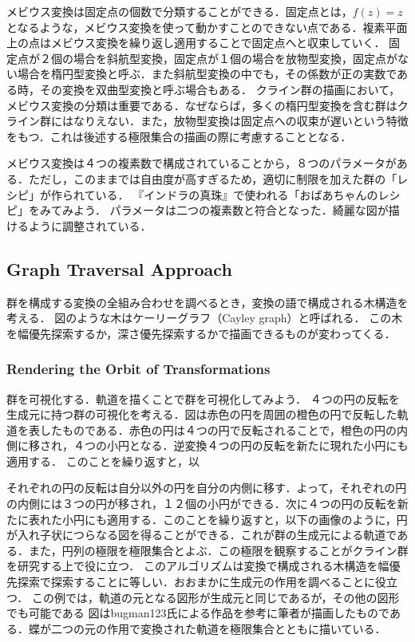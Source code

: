 メビウス変換は固定点の個数で分類することができる．固定点とは，$f(z) = z$となるような，メビウス変換を使って動かすことのできない点である．複素平面上の点はメビウス変換を繰り返し適用することで固定点へと収束していく．
固定点が２個の場合を斜航型変換，固定点が１個の場合を放物型変換，固定点がない場合を楕円型変換と呼ぶ．また斜航型変換の中でも，その係数が正の実数である時，その変換を双曲型変換と呼ぶ場合もある．
クライン群の描画において，メビウス変換の分類は重要である．なぜならば，多くの楕円型変換を含む群はクライン群にはなりえない．また，放物型変換は固定点への収束が遅いという特徴をもつ．これは後述する極限集合の描画の際に考慮することとなる．

メビウス変換は４つの複素数で構成されていることから，８つのパラメータがある．ただし，このままでは自由度が高すぎるため，適切に制限を加えた群の「レシピ」が作られている．
『インドラの真珠』で使われる「おばあちゃんのレシピ」をみてみよう．
パラメータは二つの複素数と符合となった．綺麗な図が描けるように調整されている．

\subsection{Graph Traversal Approach}

群を構成する変換の全組み合わせを調べるとき，変換の語で構成される木構造を考える．
図のような木はケーリーグラフ（Cayley graph）と呼ばれる．
この木を幅優先探索するか，深さ優先探索するかで描画できるものが変わってくる．

\subsubsection{Rendering the Orbit of Transformations}
群を可視化する．軌道を描くことで群を可視化してみよう．
４つの円の反転を生成元に持つ群の可視化を考える．図は赤色の円を周囲の橙色の円で反転した軌道を表したものである．赤色の円は４つの円で反転されることで，橙色の円の内側に移され，４つの小円となる．逆変換４つの円の反転を新たに現れた小円にも適用する．
このことを繰り返すと，以

それぞれの円の反転は自分以外の円を自分の内側に移す．よって，それぞれの円の内側には３つの円が移され，１２個の小円ができる．次に４つの円の反転を新たに表れた小円にも適用する．このことを繰り返すと，以下の画像のように，円が入れ子状につらなる図を得ることができる．これが群の生成元による軌道である．また，円列の極限を極限集合とよぶ．この極限を観察することがクライン群を研究する上で役に立つ．
このアルゴリズムは変換で構成される木構造を幅優先探索で探索することに等しい．おおまかに生成元の作用を調べることに役立つ．
この例では，軌道の元となる図形が生成元と同じであるが，その他の図形でも可能である
図はbugman123氏による作品を参考に筆者が描画したものである．蝶が二つの元の作用で変換された軌道を極限集合とともに描いている．

